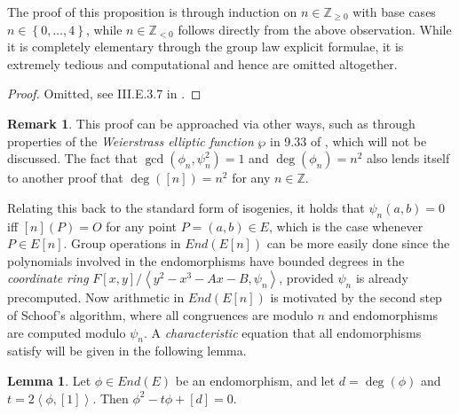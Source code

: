 \documentclass{article}
\newcommand{\Z}{\mathbb{Z}}
\newcommand{\rb}[1]{\left( #1 \right)}
\renewcommand{\sb}[1]{\left[ #1 \right]}
\newcommand{\cb}[1]{\left\{ #1 \right\}}
\newcommand{\ab}[1]{\left\langle #1 \right\rangle}
\theoremstyle{definition}\newtheorem*{definition}{Definition}
\theoremstyle{definition}\newtheorem*{example}{Example}
\theoremstyle{definition}\newtheorem*{remark}{Remark}
\newtheorem{lemma}[proposition]{Lemma}
\begin{document}
The proof of this proposition is through induction on $ n \in \Z_{\ge 0} $ with base cases $ n \in \cb{0, \dots, 4} $, while $ n \in \Z_{< 0} $ follows directly from the above observation. While it is completely elementary through the group law explicit formulae, it is extremely tedious and computational and hence are omitted altogether.

\begin{proof}
Omitted, see III.E.3.7 in \cite{gtm}.
\end{proof}

\begin{remark}
This proof can be approached via other ways, such as through properties of the \emph{Weierstrass elliptic function} $ \wp $ in 9.33 of \cite{crypto}, which will not be discussed. The fact that $ \gcd\rb{\phi_n, \psi_n^2} = 1 $ and $ \deg\rb{\phi_n} = n^2 $ also lends itself to another proof that $ \deg\rb{\sb{n}} = n^2 $ for any $ n \in \Z $.
\end{remark}

Relating this back to the standard form of isogenies, it holds that $ \psi_n\rb{a, b} = 0 $ iff $ \sb{n}\rb{P} = O $ for any point $ P = \rb{a, b} \in E $, which is the case whenever $ P \in E\sb{n} $. Group operations in $ End\rb{E\sb{n}} $ can be more easily done since the polynomials involved in the endomorphisms have bounded degrees in the \emph{coordinate ring} $ F\sb{x, y} / \ab{y^2 - x^3 - Ax - B, \psi_n} $, provided $ \psi_n $ is already precomputed. Now arithmetic in $ End\rb{E\sb{n}} $ is motivated by the second step of Schoof's algorithm, where all congruences are modulo $ n $ and endomorphisms are computed modulo $ \psi_n $. A \emph{characteristic} equation that all endomorphisms satisfy will be given in the following lemma.

\begin{lemma}
Let $ \phi \in End\rb{E} $ be an endomorphism, and let $ d = \deg\rb{\phi} $ and $ t = 2\ab{\phi, \sb{1}} $. Then $ \phi^2 - t\phi + \sb{d} = 0 $.
\end{lemma}
\end{document}
